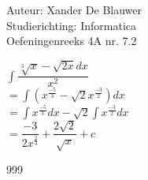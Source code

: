 \documentclass[a4paper]{article}
\begin{document}
\noindent \large Auteur: Xander De Blauwer \\
\noindent \large Studierichting: Informatica\\
\noindent \large Oefeningenreeks 4A nr. 7.2\\

\medskip

\normalsize

$ \displaystyle\int \dfrac{\sqrt[3]{x} - \sqrt{2x}dx}{x^2}$ \\

$ = \displaystyle\int (x^{\tfrac{-5}{3}} - \sqrt{2}x^{\tfrac{-3}{2}})dx$ \\

$ = \displaystyle\int x^{\tfrac{-5}{3}}dx - \sqrt{2} \displaystyle\int x^{\tfrac{-3}{2}}dx $ \\

$ = \dfrac{-3}{2x^{\tfrac{2}{3}}} + \dfrac{2\sqrt{2}}{\sqrt{x}} + c $ \\ 




\begin{thebibliography}{999}
\end{thebibliography}
\end{document}
